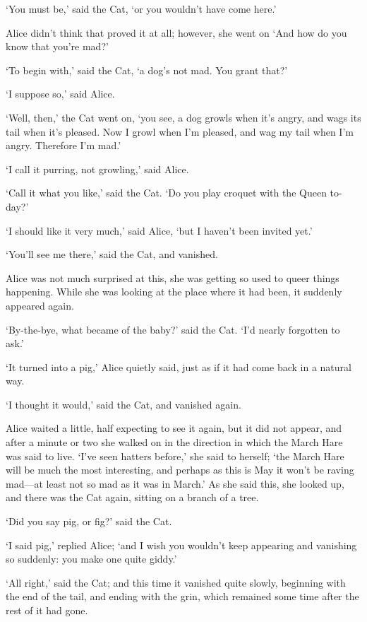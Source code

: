 \documentclass[12pt]{article}
\begin{document}
\begin{Parallel}[p]{}{}
{‘You must be,’ said the Cat, ‘or you wouldn’t have come here.’

Alice didn’t think that proved it at all; however, she went on ‘And how do you know that you’re mad?’

‘To begin with,’ said the Cat, ‘a dog’s not mad. You grant that?’

‘I suppose so,’ said Alice.

‘Well, then,’ the Cat went on, ‘you see, a dog growls when it’s angry, and wags its tail when it’s pleased. Now I growl when I’m pleased, and wag my tail when I’m angry. Therefore I’m mad.’

‘I call it purring, not growling,’ said Alice.

‘Call it what you like,’ said the Cat. ‘Do you play croquet with the Queen to-day?’

‘I should like it very much,’ said Alice, ‘but I haven’t been invited yet.’

‘You’ll see me there,’ said the Cat, and vanished.

Alice was not much surprised at this, she was getting so used to queer things happening. While she was looking at the place where it had been, it suddenly appeared again.

‘By-the-bye, what became of the baby?’ said the Cat. ‘I’d nearly forgotten to ask.’

‘It turned into a pig,’ Alice quietly said, just as if it had come back in a natural way.

‘I thought it would,’ said the Cat, and vanished again.

Alice waited a little, half expecting to see it again, but it did not appear, and after a minute or two she walked on in the direction in which the March Hare was said to live. ‘I’ve seen hatters before,’ she said to herself; ‘the March Hare will be much the most interesting, and perhaps as this is May it won’t be raving mad—at least not so mad as it was in March.’ As she said this, she looked up, and there was the Cat again, sitting on a branch of a tree.

‘Did you say pig, or fig?’ said the Cat.

‘I said pig,’ replied Alice; ‘and I wish you wouldn’t keep appearing and vanishing so suddenly: you make one quite giddy.’

‘All right,’ said the Cat; and this time it vanished quite slowly, beginning with the end of the tail, and ending with the grin, which remained some time after the rest of it had gone.

}
\end{Parallel}
\end{document}
